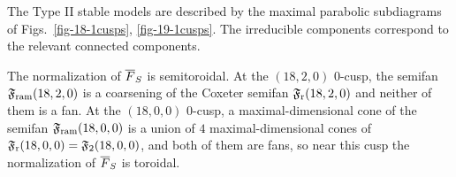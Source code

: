 \documentclass{amsart}
\begin{document}
\smallskip

The Type II stable models are described by the maximal parabolic
subdiagrams of Figs.~\ref{fig-18-1cusps}, \ref{fig-19-1cusps}. The
irreducible components correspond to the relevant connected
components.

\medskip

The normalization of ${\overline F}_S$ is semitoroidal.
At the $(18,2,0)$ $0$-cusp, the semifan ${\mathfrak F}_{\rm ram}(18,2,0)$ is a
coarsening of the Coxeter semifan ${\mathfrak F}_{\rm r}(18,2,0)$ and neither of them
is a fan. At the $(18,0,0)$ $0$-cusp, a maximal-dimensional cone of the
semifan ${\mathfrak F}_{\rm ram}(18,0,0)$ is a union of $4$ maximal-dimensional cones
of ${\mathfrak F}_{\rm r}(18,0,0)={\mathfrak F}_2(18,0,0)$, and both of them are fans,
so near this cusp the normalization of ${\overline F}_S$ is toroidal.


%
\end{document}
